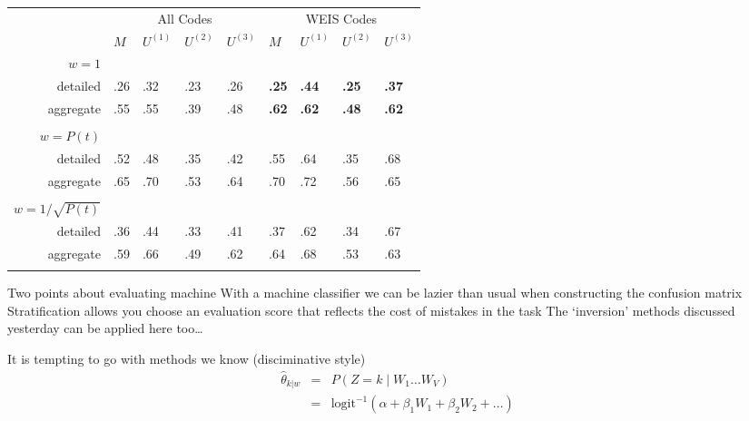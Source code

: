 \documentclass{mediumfoils}
\begin{document}

{\small
\begin{center}  
\begin{tabular}{r|llll|llll}
            & \multicolumn{4}{c}{All Codes} & \multicolumn{4}{c}{WEIS Codes} \\
& $M$ & $U^{(1)}$ & $U^{(2)}$ & $U^{(3)}$ & $M$ & $U^{(1)}$ & $U^{(2)}$ & $U^{(3)}$ \\
$w=1$    &     &     &     &       &      &     &     & \\
detailed    & .26 & .32 & .23 & .26   &  \textbf{.25} & \textbf{.44} & \textbf{.25} & \textbf{.37} \\
aggregate   & .55 & .55 & .39 & .48   &  \textbf{.62} & \textbf{.62} & \textbf{.48} & \textbf{.62} \\
            &     &     &     &       &      &     &     &  \\
$w=P(t)$    &     &     &     &      &      &     &    & \\
detailed    & .52 & .48 & .35 & .42   &  .55 & .64 & .35 & .68 \\
aggregate   & .65 & .70 & .53 & .64   &  .70 & .72 & .56 & .65 \\
            &     &     &     &       &      &     &     &  \\
$w=1/\sqrt{P(t)}$&&       &     &       &      &     &     & \\
detailed    & .36 & .44 & .33 & .41   &  .37 & .62 & .34 & .67 \\
aggregate   & .59 & .66 & .49 & .62   &  .64 & .68 & .53 & .63 \\
            &     &     &     &       &      &     &     &  \\
\end{tabular}
\end{center}
}



Two points about evaluating machine 
\ita
\itm With a machine classifier we can be lazier than usual when constructing the confusion matrix
\itm Stratification allows you choose an evaluation score that reflects the cost of mistakes in the task
\itm The `inversion' methods discussed yesterday can be applied here too\ldots 
\itz


It is tempting to go with methods we know (disciminative style)
\begin{eqnarray*}
\hat{\theta}_{k|w} &=& P(Z=k \mid W_1 \ldots W_V)\\
         &=& \text{logit}^{-1}(\alpha + \beta_1 W_1 + \beta_2 W_2 + \ldots)
\end{eqnarray*}
\end{document}
